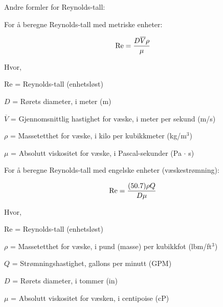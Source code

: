 





\noindent
Andre formler for Reynolds-tall:

\vskip 10pt

For å beregne Reynolds-tall med metriske enheter:

$$\hbox{Re} = {{D \overline{V} \rho} \over \mu}$$

\noindent
Hvor,

Re = Reynolds-tall (enhetsløst)

$D$ = Rørets diameter, i meter (m)

$\overline{V}$ = Gjennomsnittlig hastighet for væske, i meter per sekund (m/s)

$\rho$ = Massetetthet for væske, i kilo per kubikkmeter (kg/m$^{3}$)

$\mu$ = Absolutt viskositet for væske, i Pascal-sekunder (Pa $\cdot$ s)

\vskip 60pt \goodbreak

For å beregne Reynolds-tall med engelske enheter (væskestrømning):

$$\hbox{Re} = {{(50.7) \rho Q} \over {D \mu}}$$

\noindent
Hvor,

Re = Reynolds-tall (enhetsløst)

$\rho$ = Massetetthet for væske, i pund (masse) per kubikkfot (lbm/ft$^{3}$)

$Q$ = Strømningshastighet, gallons per minutt (GPM)

$D$ = Rørets diameter, i tommer (in)

$\mu$ = Absolutt viskositet for væsken, i centipoise (cP)



